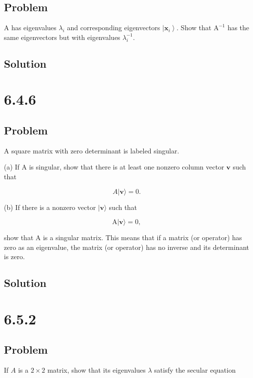 \documentclass[12pt]{article}
\begin{document}
\subsection{Problem}

A has eigenvalues \(\lambda_i\) and corresponding eigenvectors \(\left|\mathbf{x}_i\right\rangle \). Show that \(\mathrm{A}^{-1}\) has the same eigenvectors but with eigenvalues \(\lambda_i^{-1}\).

\subsection{Solution}

\newpage
\section{6.4.6}

\subsection{Problem}

A square matrix with zero determinant is labeled singular.

(a) If \(\mathrm{A}\) is singular, show that there is at least one nonzero column vector \(\mathbf{v}\) such that

\[
    A|\mathbf{v}\rangle=0 .
\]

(b) If there is a nonzero vector \(|\mathbf{v}\rangle \) such that

\[
    \mathrm{A}|\mathbf{v}\rangle=0,
\]

show that \(\mathrm{A}\) is a singular matrix. This means that if a matrix (or operator) has zero as an eigenvalue, the matrix (or operator) has no inverse and its determinant is zero.

\subsection{Solution}

\newpage
\section{6.5.2}

\subsection{Problem}

If \(A\) is a \(2 \times 2\) matrix, show that its eigenvalues \(\lambda \) satisfy the secular equation
\end{document}
